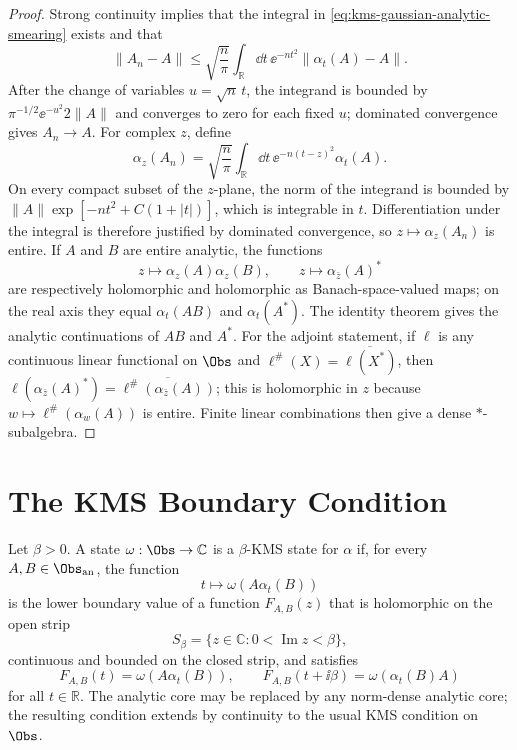 \begin{proof}
Strong continuity implies that the integral in
\eqref{eq:kms-gaussian-analytic-smearing} exists and that
\[
  \|A_n-A\|
  \leq
  \sqrt{\frac{n}{\pi}}\int_{\mathbb R}\dd t\,\ee^{-nt^2}
  \|\alpha_t(A)-A\| .
\]
After the change of variables \(u=\sqrt n\,t\), the integrand is bounded by
\(\pi^{-1/2}\ee^{-u^2}2\|A\|\) and converges to zero for each fixed \(u\);
dominated convergence gives \(A_n\to A\).  For complex \(z\), define
\[
  \alpha_z(A_n)
  =
  \sqrt{\frac{n}{\pi}}
  \int_{\mathbb R}\dd t\,\ee^{-n(t-z)^2}\alpha_t(A).
\]
On every compact subset of the \(z\)-plane, the norm of the integrand is
bounded by \(\|A\|\exp[-n t^2+C(1+|t|)]\), which is integrable in \(t\).
Differentiation under the integral is therefore justified by dominated
convergence, so \(z\mapsto\alpha_z(A_n)\) is entire.  If \(A\) and \(B\) are
entire analytic, the functions
\[
  z\longmapsto \alpha_z(A)\alpha_z(B),
  \qquad
  z\longmapsto \alpha_{\bar z}(A)^\ast
\]
are respectively holomorphic and holomorphic as Banach-space-valued maps; on
the real axis they equal \(\alpha_t(AB)\) and \(\alpha_t(A^\ast)\).  The
identity theorem gives the analytic continuations of \(AB\) and \(A^\ast\).
For the adjoint statement, if \(\ell\) is any continuous linear functional on
\(\Obs\) and \(\ell^\#(X)=\overline{\ell(X^\ast)}\), then
\(\ell(\alpha_{\bar z}(A)^\ast)=\overline{\ell^\#(\alpha_{\bar z}(A))}\);
this is holomorphic in \(z\) because \(w\mapsto\ell^\#(\alpha_w(A))\) is
entire.  Finite linear combinations then give a dense \(\ast\)-subalgebra.
\end{proof}

\section{The KMS Boundary Condition}

\begin{definition}
\label{def:thermal-volume-kms-state}
Let \(\beta>0\).  A state \(\omega:\Obs\to\mathbb C\) is a
\(\beta\)-KMS state for \(\alpha\) if, for every \(A,B\in\Obs_{\rm an}\), the
function
\[
  t\longmapsto \omega\!\left(A\alpha_t(B)\right)
\]
is the lower boundary value of a function \(F_{A,B}(z)\) that is holomorphic
on the open strip
\[
  S_\beta=\{z\in\mathbb C:0<\operatorname{Im}z<\beta\},
\]
continuous and bounded on the closed strip, and satisfies
\begin{equation}
  F_{A,B}(t)=\omega\!\left(A\alpha_t(B)\right),
  \qquad
  F_{A,B}(t+\ii\beta)=\omega\!\left(\alpha_t(B)A\right)
  \label{eq:volume-x-kms-boundary-condition}
\end{equation}
for all \(t\in\mathbb R\).  The analytic core may be replaced by any
norm-dense analytic core; the resulting condition extends by continuity to
the usual KMS condition on \(\Obs\).
\end{definition}

